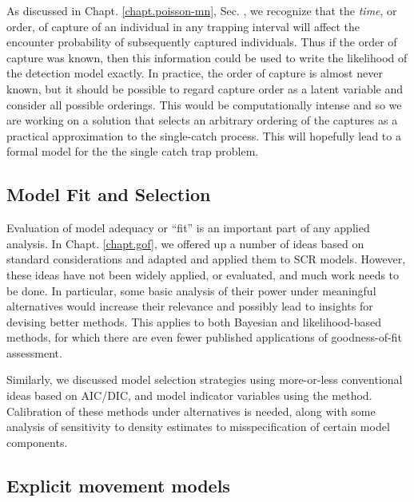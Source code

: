 As discussed in Chapt. \ref{chapt.poisson-mn},
Sec. \label{poisson-mn.sec.singlecatch},
we recognize that the {\it time}, or order, of capture of an
individual in any trapping interval will affect the encounter
probability of subsequently captured individuals. Thus if
the order of capture was known, then this information could be
used to write the likelihood of the detection model exactly. In practice, the order of capture
is almost never known, but %
it should be possible to regard capture order as a latent variable and consider all
possible orderings.
This would be %
computationally intense and so we are working on a solution that selects
an arbitrary ordering of the captures as a practical approximation to the
single-catch process. This will hopefully lead to a formal model
for the the single catch trap problem.

\subsection{Model Fit and Selection}

Evaluation of model adequacy or ``fit'' is an important part of any
applied analysis. In Chapt. \ref{chapt.gof}, we offered up a number of
ideas based on standard considerations and adapted and applied them
to SCR models. However, these ideas have not been widely applied, or
evaluated, and much work needs to be done. In particular, some basic
analysis of their power under meaningful alternatives would increase
their relevance and possibly lead to insights for devising better
methods. This applies to both Bayesian and likelihood-based methods,
for which there are even fewer published applications of
goodness-of-fit assessment.

Similarly, we discussed model selection strategies using more-or-less
conventional ideas based on AIC/DIC, and model indicator variables
using the \citet{kuo_mallick:1998} method. Calibration of these
methods under alternatives is needed, along with some analysis of
sensitivity to density estimates to misspecification of certain model
components.


\subsection{Explicit movement models}


